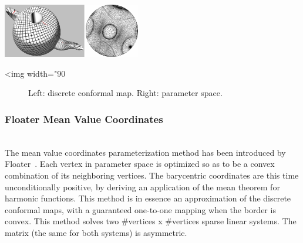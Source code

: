 \begin{center}
    \label{Surface_mesh_parameterization-fig-conformal}
    \begin{ccTexOnly}
        \includegraphics[width=0.45\textwidth]{Surface_mesh_parameterization/conformal}
    \end{ccTexOnly}
    \begin{ccHtmlOnly}
        <img width="90%
    \end{ccHtmlOnly}
    \begin{figure}[h]
        \caption{Left: discrete conformal map. Right: parameter space.}
    \end{figure}
\end{center}

\subsubsection{Floater Mean Value Coordinates}

  \\

The mean value coordinates parameterization method has been introduced
by Floater~\cite{cgal:f-mvc-03}. Each vertex in parameter space is
optimized so as to be a convex combination of its neighboring
vertices. The barycentric coordinates are this time unconditionally
positive, by deriving an application of the mean theorem for harmonic
functions. This method is in essence an approximation of the discrete conformal
maps, with a guaranteed one-to-one mapping when the border is convex. This method solves two \#vertices x \#vertices sparse linear systems. The matrix (the
same for both systems) is asymmetric.

